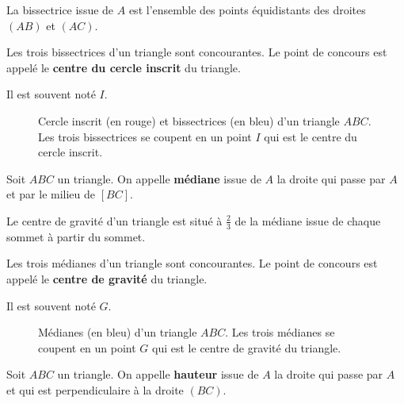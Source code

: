 \documentclass[a4paper, 12pt]{article}
\begin{document}
\begin{proposition}{}{}
    La bissectrice issue de $A$ est l'ensemble des points équidistants des droites $(AB)$ et $(AC)$.
\end{proposition}

\begin{theoreme}{}{}
    Les trois bissectrices d'un triangle sont concourantes. Le point de concours est appelé le \textbf{centre du cercle inscrit} du triangle.
    
    Il est souvent noté $I$.
\end{theoreme}

\tikzexternalenable
\begin{figure}[H]
    \centering
    \resizebox{0.6\textwidth}{!}{%
    
    }
    \caption{Cercle inscrit (en rouge) et bissectrices (en bleu) d'un triangle $ABC$. Les trois bissectrices se coupent en un point $I$ qui est le centre du cercle inscrit.}
\end{figure}
\tikzexternaldisable

\begin{definition}
    Soit $ABC$ un triangle. On appelle \textbf{médiane} issue de $A$ la droite qui passe par $A$ et par le milieu de $[BC]$.
\end{definition}

\begin{proposition}{}{}
    Le centre de gravité d'un triangle est situé à $\frac{2}{3}$ de la médiane issue de chaque sommet à partir du sommet.
\end{proposition}

\begin{theoreme}{}{}
    Les trois médianes d'un triangle sont concourantes. Le point de concours est appelé le \textbf{centre de gravité} du triangle.
    
    Il est souvent noté $G$.
\end{theoreme}

\tikzexternalenable
\begin{figure}[H]
    \centering
    \resizebox{0.6\textwidth}{!}{%
    
    }
    \caption{Médianes (en bleu) d'un triangle $ABC$. Les trois médianes se coupent en un point $G$ qui est le centre de gravité du triangle.}
\end{figure}
\tikzexternaldisable

\begin{definition}
    Soit $ABC$ un triangle. On appelle \textbf{hauteur} issue de $A$ la droite qui passe par $A$ et qui est perpendiculaire à la droite $(BC)$.
\end{definition}
\end{document}
